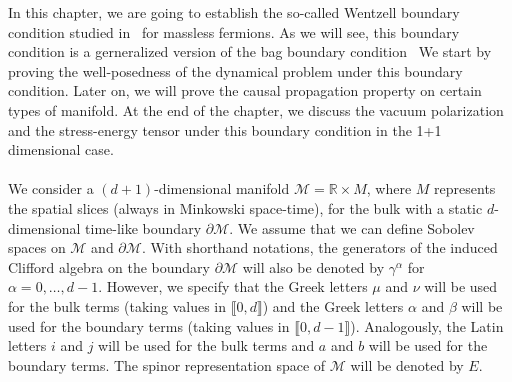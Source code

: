In this chapter, we are going to establish the so-called Wentzell boundary condition studied in~\cite{Zahn2016} for massless fermions.
As we will see, this boundary condition is a gerneralized version of the bag boundary condition~\cite{Chodos1974}
We start by proving the well-posedness of the dynamical problem under this boundary condition. 
Later on, we will prove the causal propagation property on certain types of manifold.
At the end of the chapter, 
we discuss the vacuum polarization and the stress-energy tensor under this boundary condition in the 1+1 dimensional case.
\\\\
We consider a $(d+1)$-dimensional manifold $\mathcal{M} = \mathbb{R}\times M$, where $M$ represents the spatial slices (always in Minkowski space-time), for the bulk with a static $d$-dimensional time-like boundary $\partial \mathcal{M}$.
We assume that we can define Sobolev spaces on $\mathcal{M}$ and $\partial \mathcal{M}$.
%
With shorthand notations, the generators of the induced Clifford algebra on the boundary $\partial \mathcal{M}$ will also be denoted by $\gamma^\alpha$ for $\alpha = 0 ,\ldots, d-1$. 
However, we specify that the Greek letters $\mu$ and $\nu$ will be used for the bulk terms (taking values in $\llbracket 0, d \rrbracket$) and the Greek letters $\alpha$ and $\beta$ will be used for the boundary terms (taking values in $\llbracket 0, d-1 \rrbracket$).
Analogously, the Latin letters $i $ and $j$ will be used for the bulk terms and $a$ and $b$ will be used for the boundary terms. 
The spinor representation space of $\mathcal{M}$ will be denoted by $E$.
%
